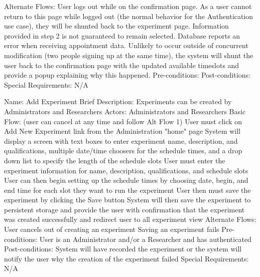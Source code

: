 \begin{outline}[enumerate]
\2 Alternate Flows:
\3 User logs out while on the confirmation page.
\4 As a user cannot return to this page while logged out (the normal behavior for the Authentication use case), they will be shunted back to the experiment page.  Information provided in step 2 is not guaranteed to remain selected.
\3 Database reports an error when receiving appointment data.
\4 Unlikely to occur outside of concurrent modification (two people signing up at the same time), the system will shunt the user back to the confirmation page with the updated available timeslots and provide a popup explaining why this happened.
\2 Pre-conditions:
\2 Post-conditions:
\2 Special Requirements:
\3 N/A



\1 Name: Add Experiment
\2 Brief Description: Experiments can be created by Administrators and Researchers
\2 Actors: Administrators and Researchers
\2 Basic Flow: (user can cancel at any time and follow Alt Flow 1)
\3 User must click on Add New Experiment link from the Administration "home" page
\3 System will display a screen with text boxes to enter experiment name, description,  and qualifications, multiple date/time choosers for the schedule times, and a drop down list to specify the length of the schedule slots
\3 User must enter the experiment information for name, description, qualifications, and schedule slots
\3 User can then begin setting up the schedule times by choosing date, begin, and end time for each slot they want to run the experiment
\3 User then must save the experiment by clicking the Save button
\3 System will then save the experiment to persistent storage and provide the user with confirmation that the experiment was created successfully and redirect user to all experiment view
\2 Alternate Flows:
\3 User cancels out of creating an experiment
\3 Saving an experiment fails
\2 Pre-conditions:
\3 User is an Administrator and/or a Researcher and has authenticated
\2 Post-conditions:
\3 System will have recorded the experiment or the system will notify the user why the creation of the experiment failed
\2 Special Requirements:
\3 N/A


\end{outline}
